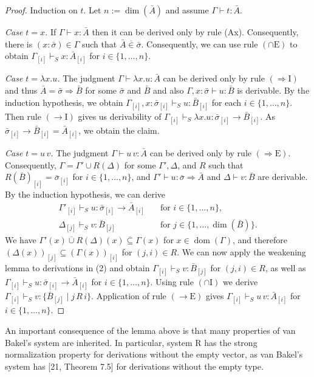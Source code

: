\documentclass[10pt,a4paper]{article}
\newcommand{\Av}{\bar A}\newcommand{\Bv}{\bar B}\newcommand{\Cv}{\bar C}
\newcommand{\sv}{\bar\sigma}\newcommand{\tv}{\bar\tau}
\newcommand{\vsub}{\mathrel{\overline{\subseteq}}}
\newcommand{\vin}{\mathrel{\overline{\in}}}
\newcommand{\vcup}{\mathbin{\overline{\cup}}}
\newcommand{\dimn}{\operatorname{dim}}
\newcommand{\dom}{\operatorname{dom}}
\newcommand{\pmstrictjudgment}[3]{#1\vdash_S #2:#3}
\begin{document}
\begin{proof}
Induction on $t$. Let $n:=\dimn(\Av)$ and assume $\Gamma\vdash t:\Av$.\par
\emph{Case $t=x$.} If $\Gamma\vdash x:\Av$ then it can be derived only by rule (Ax). Consequently, there is $(x:\sv)\in\Gamma$ such that $\Av\vin\sv$. Consequently, we can use rule $(\cap\mathrm E)$ to obtain $\pmstrictjudgment{\Gamma_{[i]}}x{\Av_{[i]}}$ for $i\in\{1,\ldots,n\}$.\par
\emph{Case $t=\lambda x.u$.} The judgment $\Gamma\vdash\lambda x.u:\Av$ can be derived only by rule $(\Rightarrow\mathrm I)$ and thus $\Av=\sv\Rightarrow\Bv$ for some $\sv$ and $\Bv$ and also $\Gamma,x:\sv\vdash u:\Bv$ is derivable. By the induction hypothesis, we obtain $\pmstrictjudgment{\Gamma_{[i]},x:\sv_{[i]}}u{\Bv_{[i]}}$ for each $i\in\{1,\ldots,n\}$. Then rule $(\to\mathrm I)$ gives us derivability of $\pmstrictjudgment{\Gamma_{[i]}}{\lambda x.u}{\sv_{[i]}\to\Bv_{[i]}}$. As $\sv_{[i]}\to\Bv_{[i]}=\Av_{[i]}$, we obtain the claim.\par
\emph{Case $t=u\,v$.} The judgment $\Gamma\vdash u\,v:\Av$ can be derived only by rule $(\Rightarrow\mathrm E)$. Consequently, $\Gamma=\Gamma'\cup R(\Delta)$ for some $\Gamma',\Delta$, and $R$ such that $R(\Bv)_{[i]}=\sv_{[i]}$ for $i\in\{1,\ldots,n\}$, and $\Gamma'\vdash u:\sv\Rightarrow\Av$ and $\Delta\vdash v:\Bv$ are derivable. By the induction hypothesis, we can derive
\begin{equation*}\begin{aligned}
\pmstrictjudgment{\Gamma'_{[i]}}u{\sv_{[i]}\to\Av_{[i]}}&\quad\text{for }i\in\{1,\ldots,n\},\\
\pmstrictjudgment{\Delta_{[j]}}v{\Bv_{[j]}}&\quad\text{for }j\in\{1,\ldots,\dimn(\Bv)\}.
\end{aligned}\tag{2}\end{equation*}
We have $\Gamma'(x)\vcup R(\Delta)(x)\vsub\Gamma(x)$ for $x\in\dom(\Gamma)$, and therefore $(\Delta(x))_{[j]}\subseteq(\Gamma(x))_{[i]}$ for $(j,i)\in R$. We can now apply the weakening lemma to derivations in (2) and obtain $\pmstrictjudgment{\Gamma_{[i]}}v{\Bv_{[j]}}$ for $(j,i)\in R$, as well as $\pmstrictjudgment{\Gamma_{[i]}}u{\sv_{[i]}\to\Av_{[i]}}$ for $i\in\{1,\ldots,n\}$. Using rule $(\cap\mathrm I)$ we derive $\pmstrictjudgment{\Gamma_{[i]}}v{\{\Bv_{[j]}\mid j\,R\,i\}}$. Application of rule $(\to\mathrm E)$ gives $\pmstrictjudgment{\Gamma_{[i]}}{u\,v}{\Av_{[i]}}$ for $i\in\{1,\ldots,n\}$.
\end{proof}
An important consequence of the lemma above is that many properties of van Bakel's system are inherited. In particular, system R has the strong normalization property for derivations without the empty vector, as van Bakel's system has [21, Theorem 7.5] for derivations without the empty type.
\end{document}
